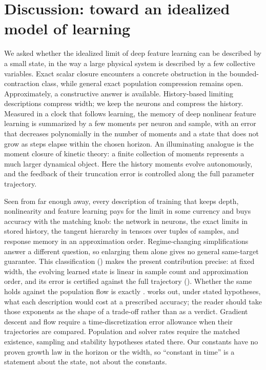 \documentclass[11pt]{article}
\theoremstyle{definition}
\theoremstyle{remark}
\begin{document}
\clearpage
\section{Discussion: toward an idealized model of learning}

We asked whether the idealized limit of deep feature learning can be described
by a small state, in the way a large physical system is described by a few
collective variables.  Exact scalar closure encounters a concrete obstruction
in the bounded-contraction class, while general exact population compression
remains open.  Approximately, a constructive answer is available.
History-based limiting descriptions compress width; we keep
the neurons and compress the history.  Measured in a clock that follows learning,
the memory of deep nonlinear feature learning is summarized by a few moments per
neuron and sample, with an error that decreases polynomially in the number of
moments and a state that does not grow as steps elapse within the chosen
horizon.  An illuminating analogue is the moment closure of kinetic theory:
a finite collection of moments represents a much larger dynamical object.
Here the history moments evolve autonomously, and the feedback of their
truncation error is controlled along the full parameter trajectory.

Seen from far enough away, every description of training that keeps depth,
nonlinearity and feature learning pays for the limit in some currency and buys
accuracy with the matching knob: the network in neurons, the exact limits in
stored history, the tangent hierarchy in tensors over tuples of samples, and
response memory in an approximation order.  Regime-changing simplifications
answer a different question, so enlarging them alone gives no general
same-target guarantee.  This classification () makes
the present contribution precise: at fixed width, the evolving learned state
is linear in sample count and approximation order, and its error is certified
against the full trajectory ().  Whether the same holds against the
population flow is exactly .   works out,
under stated hypotheses, what each description would cost at a prescribed
accuracy; the reader should take those exponents as the shape of a trade-off
rather than as a verdict.  Gradient descent and flow require a time-discretization
error allowance when their trajectories are compared.  Population and solver
rates require the matched existence, sampling and stability hypotheses stated
there.  Our
constants have no proven growth law in the horizon or the width, so ``constant
in time'' is a statement about the state, not about the constants.
\end{document}
